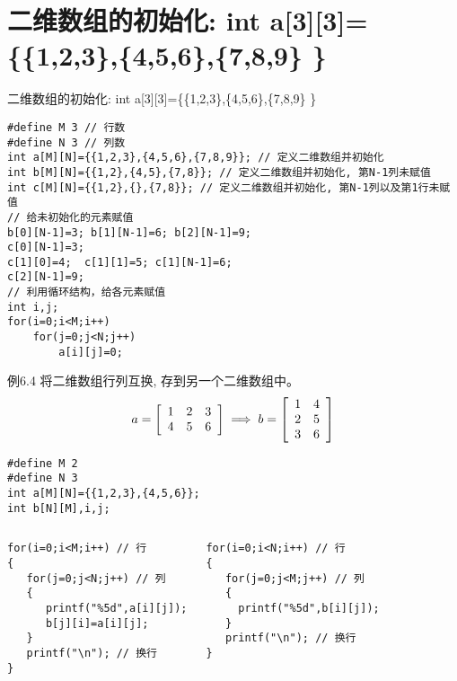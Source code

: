 \section{二维数组的初始化: int a[3][3]=\{\{1,2,3\},\{4,5,6\},\{7,8,9\} \}}

\begin{frame}{二维数组的初始化: int a[3][3]=\{\{1,2,3\},\{4,5,6\},\{7,8,9\} \}}
\vspace{-0.3cm}
\begin{lstlisting}
#define M 3 // 行数
#define N 3 // 列数
int a[M][N]={{1,2,3},{4,5,6},{7,8,9}}; // 定义二维数组并初始化
int b[M][N]={{1,2},{4,5},{7,8}}; // 定义二维数组并初始化, 第N-1列未赋值
int c[M][N]={{1,2},{},{7,8}}; // 定义二维数组并初始化, 第N-1列以及第1行未赋值
// 给未初始化的元素赋值
b[0][N-1]=3; b[1][N-1]=6; b[2][N-1]=9;
c[0][N-1]=3; 
c[1][0]=4;  c[1][1]=5; c[1][N-1]=6; 
c[2][N-1]=9;
// 利用循环结构，给各元素赋值
int i,j;
for(i=0;i<M;i++)
	for(j=0;j<N;j++)
		a[i][j]=0;
\end{lstlisting}
\end{frame}

\begin{frame}{例6.4 将二维数组行列互换, 存到另一个二维数组中。}
\vspace{-0.4cm}
\small
\[
a=\left[
\begin{array}[c]{ccc}
1 & 2 & 3\\
4 & 5 & 6
\end{array}
\right]
\implies
b=\left[
\begin{array}[c]{cc}
1 & 4\\
2 & 5\\
3 & 6
\end{array}
\right]
\]
\pause
\vspace{-0.5cm}
\begin{lstlisting}
#define M 2 
#define N 3 
int a[M][N]={{1,2,3},{4,5,6}};
int b[N][M],i,j;
\end{lstlisting}
\vspace{-0.4cm}
\begin{columns}[T]
\pause
\begin{lstlisting}
for(i=0;i<M;i++) // 行
{
   for(j=0;j<N;j++) // 列
   {
      printf("%5d",a[i][j]);
      b[j][i]=a[i][j]; 
   }
   printf("\n"); // 换行
}
\end{lstlisting}
\pause
\begin{lstlisting}[frame=leftline]
for(i=0;i<N;i++) // 行
{
   for(j=0;j<M;j++) // 列
   {
     printf("%5d",b[i][j]); 
   }
   printf("\n"); // 换行
}
\end{lstlisting}
\end{columns}
\vspace{0.001cm}
\end{frame}

